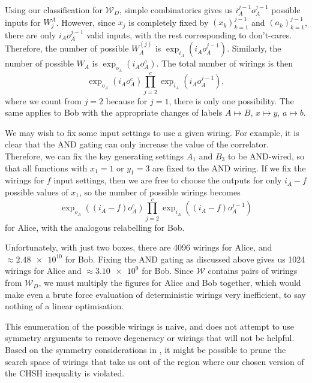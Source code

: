\documentclass[10pt, a4paper]{article}
\numberwithin{equation}{section} %
\theoremstyle{definition}
\theoremstyle{plain}
\newcommand{\?}{\mathrel{?}} %
\newcommand{\sW}{\mathcal{W}}
\begin{document}
      Using our classification for \(\sW_D\), simple combinatorics gives us \(i_A^{j-1} o_A^{j-1}\) possible inputs for \(W_j^A\). However, since \(x_j\) is completely fixed by \({(x_k)}_{k=1}^{j-1}\) and \({(a_k)}_{k=1}^{j-1}\), there are only \(i_A o_A^{j-1}\) valid inputs, with the rest corresponding to don't-cares. Therefore, the number of possible \(W^{(j)}_A\) is \(\exp_{i_A}(i_A o_A^{j-1})\). Similarly, the number of possible \(W_A\) is \(\exp_{o_A}(i_A o_A^{c})\). The total number of wirings is then
      \begin{equation}
        \exp_{o_A}(i_A o_A^c) \prod_{j=2}^c \exp_{i_A}(i_A o_A^{j-1}),
      \end{equation}
      where we count from \(j = 2\) because for \(j = 1\), there is only one possibility. The same applies to Bob with the appropriate changes of labels \(A \mapsto B\), \(x \mapsto y\), \(a \mapsto b\). 

      We may wish to fix some input settings to use a given wiring. For example, it is clear that the AND gating can only increase the value of the correlator. Therefore, we can fix the key generating settings \(A_1\) and \(B_3\) to be AND-wired, so that all functions with \(x_1 = 1\) or \(y_1 = 3\) are fixed to the AND wiring. If we fix the wirings for \(f\) input settings, then we are free to choose the outputs for only \(i_A - f\) possible values of \(x_1\), so the number of possible wirings becomes
      \begin{equation}
        \exp_{o_A}((i_A-f) o_A^c) \prod_{j=2}^c \exp_{i_A}((i_A-f) o_A^{j-1})
      \end{equation}
      for Alice, with the analogous relabelling for Bob.

      Unfortunately, with just two boxes, there are 4096 wirings for Alice, and \(\approx \num{2.48e10}\) for Bob. Fixing the AND gating as discussed above gives us 1024 wirings for Alice and \(\approx \num{3.10e9}\) for Bob. Since \(\sW\) contains pairs of wirings from \(\sW_D\), we must multiply the figures for Alice and Bob together, which would make even a brute force evaluation of deterministic wirings very inefficient, to say nothing of a linear optimisation.

      This enumeration of the possible wirings is naive, and does not attempt to use symmetry arguments to remove degeneracy or wirings that will not be helpful. Based on the symmetry considerations in , it might be possible to prune the search space of wirings that take us out of the region where our chosen version of the CHSH inequality is violated.
\end{document}
